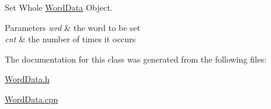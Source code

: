 Set Whole \hyperlink{classWordData}{Word\-Data} Object. 


\begin{DoxyParams}{Parameters}
{\em wrd} & the word to be set \\
\hline
{\em cnt} & the number of times it occurs \\
\hline
\end{DoxyParams}


The documentation for this class was generated from the following files\-:\begin{DoxyCompactItemize}
\item 
\hyperlink{WordData_8h}{Word\-Data.\-h}\item 
\hyperlink{WordData_8cpp}{Word\-Data.\-cpp}\end{DoxyCompactItemize}

